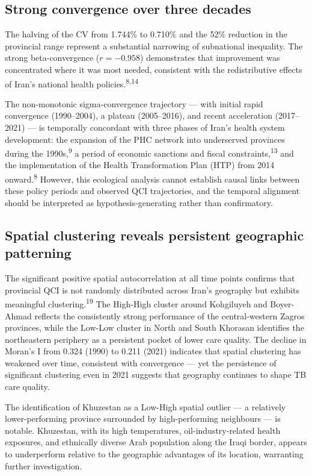 \documentclass[12pt]{article}
\begin{document}
\subsection{Strong convergence over three decades}

The halving of the CV from 1.744\% to 0.710\% and the 52\% reduction in the provincial range represent a substantial narrowing of subnational inequality. The strong beta-convergence ($r = -0.958$) demonstrates that improvement was concentrated where it was most needed, consistent with the redistributive effects of Iran's national health policies.\textsuperscript{8,14}

The non-monotonic sigma-convergence trajectory --- with initial rapid convergence (1990--2004), a plateau (2005--2016), and recent acceleration (2017--2021) --- is temporally concordant with three phases of Iran's health system development: the expansion of the PHC network into underserved provinces during the 1990s,\textsuperscript{9} a period of economic sanctions and fiscal constraints,\textsuperscript{13} and the implementation of the Health Transformation Plan (HTP) from 2014 onward.\textsuperscript{8} However, this ecological analysis cannot establish causal links between these policy periods and observed QCI trajectories, and the temporal alignment should be interpreted as hypothesis-generating rather than confirmatory.

\subsection{Spatial clustering reveals persistent geographic patterning}

The significant positive spatial autocorrelation at all time points confirms that provincial QCI is not randomly distributed across Iran's geography but exhibits meaningful clustering.\textsuperscript{19} The High-High cluster around Kohgiluyeh and Boyer-Ahmad reflects the consistently strong performance of the central-western Zagros provinces, while the Low-Low cluster in North and South Khorasan identifies the northeastern periphery as a persistent pocket of lower care quality. The decline in Moran's I from 0.324 (1990) to 0.211 (2021) indicates that spatial clustering has weakened over time, consistent with convergence --- yet the persistence of significant clustering even in 2021 suggests that geography continues to shape TB care quality.

The identification of Khuzestan as a Low-High spatial outlier --- a relatively lower-performing province surrounded by high-performing neighbours --- is notable. Khuzestan, with its high temperatures, oil-industry-related health exposures, and ethnically diverse Arab population along the Iraqi border, appears to underperform relative to the geographic advantages of its location, warranting further investigation.
\end{document}
